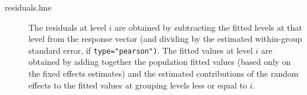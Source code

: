 \documentclass[Main.tex]{subfiles}
\begin{document}
	
	\begin{description}
		\item[residuals.lme] 
		The residuals at level $i$ are obtained by subtracting the fitted levels at that level from the response
		vector (and dividing by the estimated within-group standard error, if \texttt{type="pearson")}. The fitted
		values at level $i$ are obtained by adding together the population fitted values (based only on the
		fixed effects estimates) and the estimated contributions of the random effects to the fitted values at
		grouping levels less or equal to $i$.
	\end{description}
	
	
	
\end{document}
